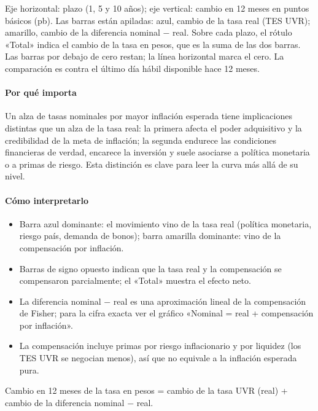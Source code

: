 \begin{leer}
Eje horizontal: plazo (1, 5 y 10 años); eje vertical: cambio en 12 meses en puntos básicos (pb). Las barras están apiladas: azul, cambio de la tasa real (TES UVR); amarillo, cambio de la diferencia nominal − real. Sobre cada plazo, el rótulo «Total» indica el cambio de la tasa en pesos, que es la suma de las dos barras. Las barras por debajo de cero restan; la línea horizontal marca el cero. La comparación es contra el último día hábil disponible hace 12 meses.
\end{leer}

\paragraph{Por qué importa}
Un alza de tasas nominales por mayor inflación esperada tiene implicaciones distintas que un alza de la tasa real: la primera afecta el poder adquisitivo y la credibilidad de la meta de inflación; la segunda endurece las condiciones financieras de verdad, encarece la inversión y suele asociarse a política monetaria o a primas de riesgo. Esta distinción es clave para leer la curva más allá de su nivel.

\paragraph{Cómo interpretarlo}
\begin{itemize}
\item Barra azul dominante: el movimiento vino de la tasa real (política monetaria, riesgo país, demanda de bonos); barra amarilla dominante: vino de la compensación por inflación.
\item Barras de signo opuesto indican que la tasa real y la compensación se compensaron parcialmente; el «Total» muestra el efecto neto.
\item La diferencia nominal − real es una aproximación lineal de la compensación de Fisher; para la cifra exacta ver el gráfico «Nominal = real + compensación por inflación».
\item La compensación incluye primas por riesgo inflacionario y por liquidez (los TES UVR se negocian menos), así que no equivale a la inflación esperada pura.
\end{itemize}
\begin{formulas}[Fórmulas]
\end{formulas}
\begin{metodo}[Metodología]
Cambio en 12 meses de la tasa en pesos = cambio de la tasa UVR (real) + cambio de la diferencia nominal − real.
\par{}
\end{metodo}


